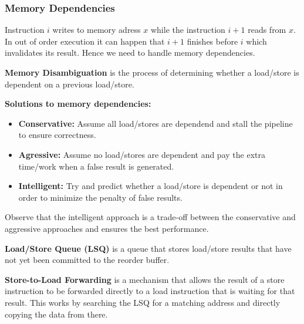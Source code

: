 \subsubsection{Memory Dependencies}

\begin{example}
	Instruction $i$ writes to memory adress $x$ while the instruction $i+1$ reads from $x$. In out of order execution it can happen that $i+1$ finishes before $i$ which invalidates its result. Hence we need to handle memory dependencies.
\end{example}

\begin{definition}
	\textbf{Memory Disambiguation} is the process of determining whether a load/store is dependent on a previous load/store.
\end{definition}

\begin{definition}
	\textbf{Solutions to memory dependencies:}
	\begin{itemize}
		\item \textbf{Conservative: } Assume all load/stores are dependend and stall the pipeline to ensure correctness.
		\item \textbf{Agressive: } Assume no load/stores are dependent and pay the extra time/work when a false result is generated.
		\item \textbf{Intelligent: } Try and predict whether a load/store is dependent or not in order to minimize the penalty of false results.
	\end{itemize}
\end{definition}

\begin{remark}
	Observe that the intelligent approach is a trade-off between the conservative and aggressive approaches and ensures the best performance.
\end{remark}

\begin{definition}
	\textbf{Load/Store Queue (LSQ)} is a queue that stores load/store results that have not yet been committed to the reorder buffer.
\end{definition}

\begin{definition}
	\textbf{Store-to-Load Forwarding} is a mechanism that allows the result of a store instruction to be forwarded directly to a load instruction that is waiting for that result. This works by searching the LSQ for a matching address and directly copying the data from there.
\end{definition}


